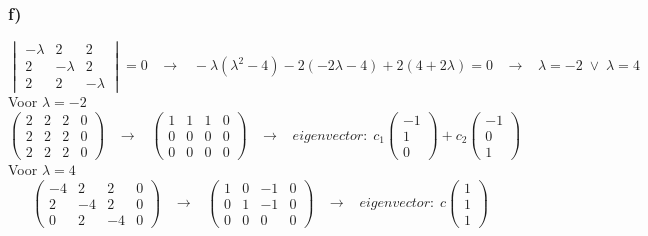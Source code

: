 \documentclass[11pt]{article}
\begin{document}
\subsubsection*{f)}
\[
\begin{vmatrix}
-\lambda & 2 & 2 \\
2 & -\lambda & 2 \\
2 & 2 & -\lambda
\end{vmatrix}
=0
\;\;\;\longrightarrow\;\;\;
-\lambda(\lambda^2-4)-2(-2\lambda-4)+2(4+2\lambda)=0
\;\;\;\longrightarrow\;\;\;
\lambda = -2 \;\vee\; \lambda = 4
\]
Voor $\lambda = -2$
\[
\left(
\begin{array}{ccc|c}
2 & 2 & 2 & 0\\
2 & 2 & 2 & 0\\
2 & 2 & 2 & 0
\end{array}
\right)
\;\;\;\longrightarrow\;\;\;
\left(
\begin{array}{ccc|c}
1 & 1 & 1 & 0 \\
0 & 0 & 0 & 0 \\
0 & 0 & 0 & 0
\end{array}
\right)
\;\;\;\longrightarrow\;\;\;
eigenvector:\;
c_1
\begin{pmatrix}
-1\\1\\0
\end{pmatrix}
+
c_2
\begin{pmatrix}
-1\\0\\1
\end{pmatrix}
\]
Voor $\lambda = 4$
\[
\left(
\begin{array}{ccc|c}
-4 & 2 & 2 & 0\\
2 & -4 & 2 & 0\\
0 & 2 & -4 & 0
\end{array}
\right)
\;\;\;\longrightarrow\;\;\;
\left(
\begin{array}{ccc|c}
1 & 0 & -1 & 0 \\
0 & 1 & -1 & 0 \\
0 & 0 & 0 & 0
\end{array}
\right)
\;\;\;\longrightarrow\;\;\;
eigenvector:\;
c
\begin{pmatrix}
1\\1\\1
\end{pmatrix}
\]
\end{document}
